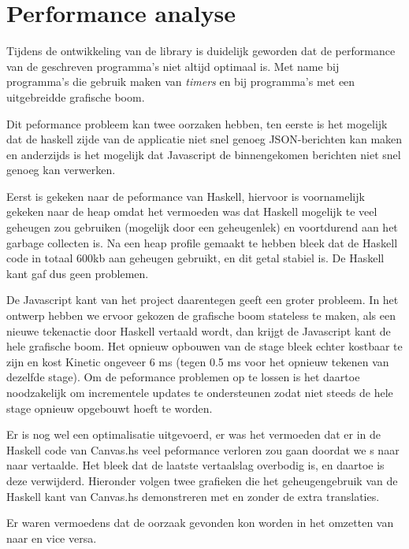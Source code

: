 \section{Performance analyse} \label{sec:performance}
Tijdens de ontwikkeling van de library is duidelijk geworden dat de performance van de geschreven programma's niet altijd optimaal is. Met name bij programma's die gebruik maken van \emph{timers} en bij programma's met een uitgebreidde grafische boom.

Dit peformance probleem kan twee oorzaken hebben, ten eerste is het mogelijk dat de haskell zijde van de applicatie niet snel genoeg JSON-berichten kan maken en anderzijds is het mogelijk dat Javascript de binnengekomen berichten niet snel genoeg kan verwerken.

Eerst is gekeken naar de peformance van Haskell, hiervoor is voornamelijk gekeken naar de heap omdat het vermoeden was dat Haskell mogelijk te veel geheugen zou gebruiken (mogelijk door een geheugenlek) en voortdurend aan het garbage collecten is. Na een heap profile gemaakt te hebben bleek dat de Haskell code in totaal 600kb aan geheugen gebruikt, en dit getal stabiel is. De Haskell kant gaf dus geen problemen.

De Javascript kant van het project daarentegen geeft een groter probleem. In het ontwerp hebben we ervoor gekozen de grafische boom stateless te maken, als een nieuwe tekenactie door Haskell vertaald wordt, dan krijgt de Javascript kant de hele grafische boom. Het opnieuw  opbouwen van de stage bleek echter kostbaar te zijn en kost Kinetic ongeveer 6 ms (tegen 0.5 ms voor het opnieuw tekenen van dezelfde stage). Om de peformance problemen op te lossen is het daartoe noodzakelijk om incrementele updates te ondersteunen zodat niet steeds de hele stage opnieuw opgebouwt hoeft te worden.

Er is nog wel een optimalisatie uitgevoerd, er was het vermoeden dat er in de Haskell code van Canvas.hs veel peformance verloren zou gaan doordat we s naar  naar  vertaalde. Het bleek dat de laatste vertaalslag overbodig is, en daartoe is deze verwijderd. Hieronder volgen twee grafieken die het geheugengebruik van de Haskell kant van Canvas.hs demonstreren met en zonder de extra translaties.

Er waren vermoedens dat de oorzaak gevonden kon worden in het omzetten van  naar  en vice versa.

